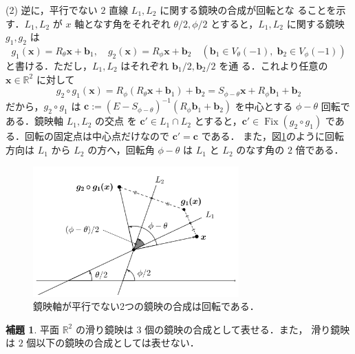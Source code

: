 \documentclass[11pt, uplatex, dvipdfmx, titlepage]{jsarticle}
\makeatletter
\DeclareMathOperator{\Fix}{Fix}
\renewenvironment{proof}[1][\proofname]{\par
  \pushQED{\qed}%
  \normalfont \topsep6\p@\@plus6\p@\relax
  \trivlist
  \item[\hskip\labelsep
         \bfseries
    {#1}]\ignorespaces
}{%
  \popQED\endtrivlist\@endpefalse
}
\theoremstyle{definition}
\newtheorem{lemma}{補題}[section]
\renewcommand{\proofname}{\textbf{証明}}
\makeatother
\begin{document}
\begin{proof}
  \noindent
  (2) 逆に，平行でない $2$ 直線 $L_1, L_2$ に関する鏡映の合成が回転とな
  ることを示す．$L_1, L_2$ が $x$ 軸となす角をそれぞれ $\theta/2,
  \phi/2$ とすると，$L_1, L_2$ に関する鏡映 $g_1, g_2$ は
  \[
    g_1(\bm{x}) = R_{\theta} \bm{x} + \bm{b}_1, \quad g_2(\bm{x}) = R_{\phi}\bm{x} + \bm{b}_2 \quad
    \left(\bm{b}_1 \in V_{\theta}(-1), \; \bm{b}_2 \in V_{\phi}(-1) \right)
  \]
  と書ける．ただし，$L_1, L_2$ はそれぞれ $\bm{b}_1/2, \bm{b}_2/2$ を通
  る．これより任意の $\bm{x} \in \mathbb{R}^2$ に対して
  \[
    g_2 \circ g_1(\bm{x}) = R_{\phi}( R_{\theta}\bm{x}+\bm{b}_1) + \bm{b}_2
    = S_{\phi-\theta} \bm{x} + R_{\phi}\bm{b}_1 +\bm{b}_2
  \]
  だから，$g_2 \circ
  g_1$ は
  $\bm{c}:=(E-S_{\phi-\theta})^{-1}\left(R_{\phi}\bm{b}_1+\bm{b}_2\right)$
  を中心とする $\phi-\theta$ 回転である．鏡映軸 $L_1, L_2$ の交点
  を $\bm{c}' \in L_1 \cap L_2$ とすると，$\bm{c}' \in \Fix(g_2 \circ
  g_1)$ である．回転の固定点は中心点だけなので $\bm{c}'=\bm{c}$ である．
  また，図\ref{fig:rotation2refgen}のように回転方向は $L_1$ から $L_2$
  の方へ，回転角 $\phi-\theta$ は $L_1$ と $L_2$ のなす角の $2$ 倍である．
  \begin{figure}[h]
    \centering
    \includegraphics[height=5cm]{pictures/rotation2refgen.pdf}   
    \caption{鏡映軸が平行でない2つの鏡映の合成は回転である．}
    \label{fig:rotation2refgen}
  \end{figure}
\end{proof}


\begin{lemma}\label{lem:glide2ref}
  平面 $\mathbb{R}^2$ の滑り鏡映は $3$ 個の鏡映の合成として表せる．また，
  滑り鏡映は $2$ 個以下の鏡映の合成としては表せない．
\end{lemma}
  
\end{document}
